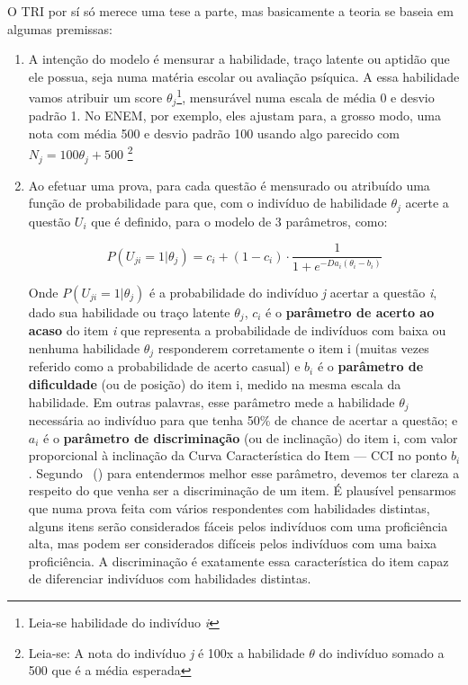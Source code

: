 \documentclass[
	article,			%
	11pt,				%
	oneside,			%
	a4paper,			%
	english,			%
	brazil,				%
	sumario=tradicional
]{abntex2}
\newcommand{\citeaa}[1]{\citeauthoronline{#1}~(\citeyear{#1})}
\begin{document}
				O TRI por sí só merece uma tese a parte, mas basicamente a teoria se baseia em algumas premissas:
				
				\begin{enumerate}[label=\alph*)]
					\item A intenção do modelo é mensurar a habilidade, traço latente ou aptidão que ele possua, seja numa matéria escolar ou avaliação psíquica. A essa habilidade vamos atribuir um score $ \theta_{j} $\footnote{Leia-se habilidade do indivíduo \textit{i}}, mensurável numa escala de média 0 e desvio padrão 1. No ENEM, por exemplo, eles ajustam para, a grosso modo, uma nota com média 500 e desvio padrão 100 usando algo parecido com $ N_{j} = 100 \theta_{j} + 500 $ \footnote{Leia-se: A nota do indivíduo \textit{j} é 100x a habilidade $ \theta $ do indivíduo somado a 500 que é a média esperada}
					
					\item Ao efetuar uma prova, para cada questão é mensurado ou atribuído uma função de probabilidade para que, com o indivíduo de habilidade $ \theta_{j} $ acerte a questão $ U_{i} $ que é definido, para o modelo de 3 parâmetros, como:
					
					
					\[ P(U_{ji} = 1 | \theta_{j}) = c_{i} + (1 - c_{i}) \cdot \dfrac{1}{1 + e^{-D a_{i} ( \theta_{i} - b_{i})}} \]
					
					Onde $ P(U_{ji} = 1 | \theta_{j}) $ é a probabilidade do indivíduo \textit{j} acertar a questão \textit{i}, dado sua habilidade ou traço latente $ \theta_{j} $, $ c_{i} $ é o \textbf{parâmetro de acerto ao acaso} do item \textit{i} que representa a probabilidade de indivíduos com baixa ou nenhuma habilidade $ \theta_{j} $ responderem corretamente o item i (muitas vezes referido como a probabilidade de acerto casual) e $ b_{i} $ é o \textbf{parâmetro de dificuldade} (ou de posição) do item i, medido na mesma escala da habilidade. Em outras palavras, esse parâmetro mede a habilidade $ \theta_{j} $ necessária ao indivíduo para que tenha 50\% de chance de acertar a questão; e $ a_{i} $ é o \textbf{parâmetro de discriminação} (ou de inclinação) do item i, com valor proporcional à inclinação da Curva Característica do Item — CCI no ponto $ b_{i} $. Segundo \citeaa{SilvaGomes2014} para entendermos melhor esse parâmetro, devemos ter clareza a respeito do que venha ser a discriminação de um item. É plausível pensarmos que numa prova feita com vários respondentes com habilidades distintas, alguns itens serão considerados fáceis pelos indivíduos com uma proficiência alta, mas podem ser considerados difíceis pelos indivíduos com uma baixa proficiência. A discriminação é exatamente essa característica do item capaz de diferenciar indivíduos com habilidades distintas.


\end{enumerate}
\end{document}
